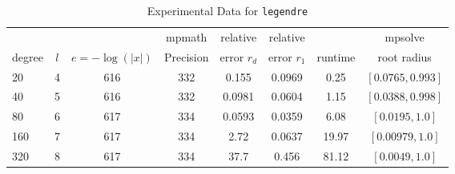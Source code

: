 \documentclass[sigconf]{acmart}
\begin{document}
\begin{table}[t]
\caption{Experimental Data for \texttt{legendre}} %
\label{tab:legendre}
\vskip -0.15in
\begin{center}
\begin{small}
\begin{sc}
\begin{tabular}{lccccccc}
\toprule
&  &  & mpmath & relative  & relative &  & mpsolve \\
degree  & $l$& $e=-\log(|x|)$& Precision &error $r_d$       & error $r_1$ &runtime& root radius\\
\midrule
 20 & 4 & 616 & 332 & 0.155 & 0.0969 & 0.25 & $[0.0765, 0.993]$\\
 40 & 5 & 616 & 332 & 0.0981 & 0.0604 & 1.15 & $[0.0388, 0.998]$\\
 80 & 6 & 617 & 334 & 0.0593 & 0.0359 & 6.08 & $[0.0195, 1.0]$\\
  160 & 7 & 617 & 334 & 2.72 & 0.0637 & 19.97 & $[0.00979, 1.0]$\\
 320 & 8 & 617 & 334 & 37.7 & 0.456 & 81.12 & $[0.0049, 1.0]$\\
\bottomrule
\end{tabular}
\end{sc}
\end{small}
\end{center}
\vskip 0.05in
\end{table}
\end{document}

